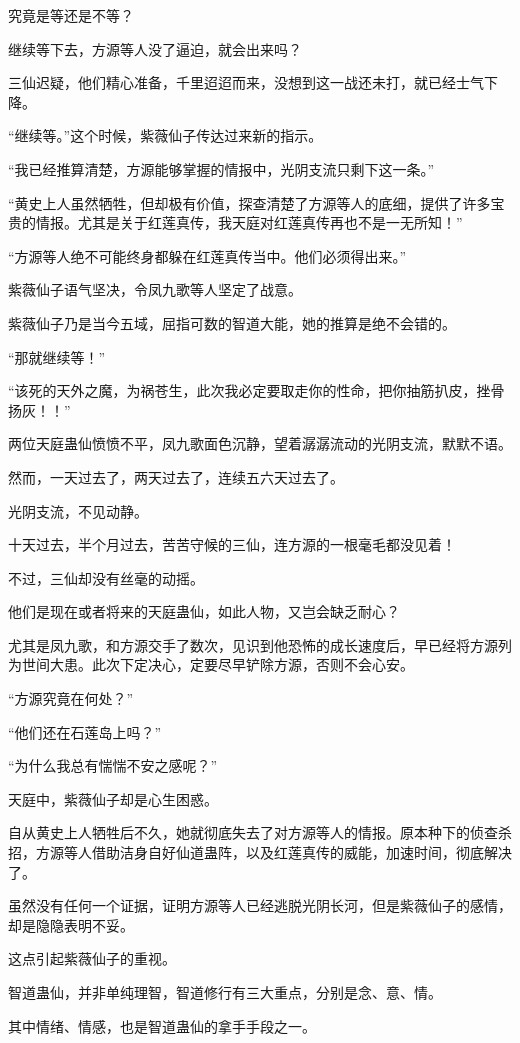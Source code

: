 \begin{this_body}
究竟是等还是不等？

继续等下去，方源等人没了逼迫，就会出来吗？

三仙迟疑，他们精心准备，千里迢迢而来，没想到这一战还未打，就已经士气下降。

“继续等。”这个时候，紫薇仙子传达过来新的指示。

“我已经推算清楚，方源能够掌握的情报中，光阴支流只剩下这一条。”

“黄史上人虽然牺牲，但却极有价值，探查清楚了方源等人的底细，提供了许多宝贵的情报。尤其是关于红莲真传，我天庭对红莲真传再也不是一无所知！”

“方源等人绝不可能终身都躲在红莲真传当中。他们必须得出来。”

紫薇仙子语气坚决，令凤九歌等人坚定了战意。

紫薇仙子乃是当今五域，屈指可数的智道大能，她的推算是绝不会错的。

“那就继续等！”

“该死的天外之魔，为祸苍生，此次我必定要取走你的性命，把你抽筋扒皮，挫骨扬灰！！”

两位天庭蛊仙愤愤不平，凤九歌面色沉静，望着潺潺流动的光阴支流，默默不语。

然而，一天过去了，两天过去了，连续五六天过去了。

光阴支流，不见动静。

十天过去，半个月过去，苦苦守候的三仙，连方源的一根毫毛都没见着！

不过，三仙却没有丝毫的动摇。

他们是现在或者将来的天庭蛊仙，如此人物，又岂会缺乏耐心？

尤其是凤九歌，和方源交手了数次，见识到他恐怖的成长速度后，早已经将方源列为世间大患。此次下定决心，定要尽早铲除方源，否则不会心安。

“方源究竟在何处？”

“他们还在石莲岛上吗？”

“为什么我总有惴惴不安之感呢？”

天庭中，紫薇仙子却是心生困惑。

自从黄史上人牺牲后不久，她就彻底失去了对方源等人的情报。原本种下的侦查杀招，方源等人借助洁身自好仙道蛊阵，以及红莲真传的威能，加速时间，彻底解决了。

虽然没有任何一个证据，证明方源等人已经逃脱光阴长河，但是紫薇仙子的感情，却是隐隐表明不妥。

这点引起紫薇仙子的重视。

智道蛊仙，并非单纯理智，智道修行有三大重点，分别是念、意、情。

其中情绪、情感，也是智道蛊仙的拿手手段之一。


\end{this_body}
